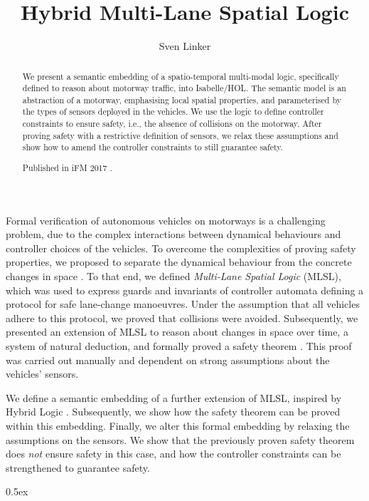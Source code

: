 \documentclass[11pt,a4paper]{article}
\begin{document}
\title{Hybrid Multi-Lane Spatial Logic}
\author{Sven Linker}
\maketitle

\begin{abstract}
We present a semantic embedding of a spatio-temporal multi-modal
logic, specifically defined to reason about motorway traffic, into Isabelle/HOL. 
The semantic model is an abstraction of a motorway, 
emphasising local spatial properties, and parameterised by the types of sensors
deployed in the vehicles. We use the logic
to define controller constraints to ensure safety, i.e., the
absence of collisions on the motorway. 
After proving safety with a restrictive definition of
sensors, we relax these assumptions and show how to amend
the controller constraints to still guarantee safety.

Published in iFM 2017 \cite{Linker2017}.
\end{abstract}

Formal verification of autonomous vehicles on motorways is a challenging problem, 
due to the complex interactions between
dynamical behaviours and controller choices of the vehicles. 
 To overcome the complexities of proving safety properties, we proposed
to separate the dynamical behaviour from 
the concrete changes in space \cite{Hilscher2011}. To that end, we
defined
\emph{Multi-Lane Spatial Logic} (MLSL), which  was used to express guards and invariants
of controller automata defining a protocol for safe lane-change manoeuvres. Under the assumption
that all vehicles adhere to this protocol, we 
proved
that collisions were avoided. 
Subsequently, we presented an extension of MLSL to 
reason about 
changes in space over time, 
a system of natural deduction,  
and formally proved 
a safety theorem \cite{Linker2015a,Linker2015b}.
This proof was carried out manually and 
dependent on 
 strong
assumptions about the vehicles' sensors. 

We define
a semantic embedding of a further extension of MLSL, inspired 
by Hybrid Logic \cite{Brauner2010}. 
 Subsequently, we show how 
 the safety theorem can be proved within this embedding.
Finally, we alter this formal embedding by relaxing the assumptions on the sensors. We show
that the previously proven safety theorem does \emph{not} ensure
safety in this case, and how the controller constraints can 
be strengthened to guarantee safety.

\tableofcontents

\parindent 0pt\parskip 0.5ex





\end{document}
